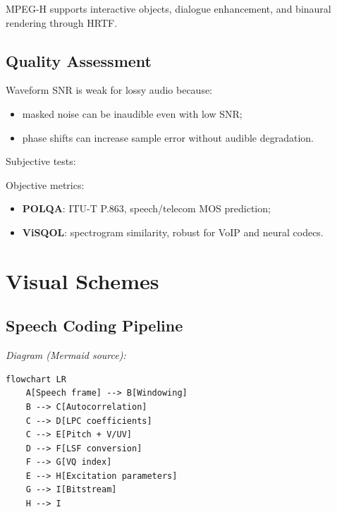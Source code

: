 MPEG-H supports interactive objects, dialogue enhancement, and binaural rendering through HRTF.

\subsection{Quality Assessment}

Waveform SNR is weak for lossy audio because:

\begin{itemize}
  \item masked noise can be inaudible even with low SNR;
  \item phase shifts can increase sample error without audible degradation.
\end{itemize}

Subjective tests:

\begin{center}
\end{center}

Objective metrics:

\begin{itemize}
  \item \textbf{POLQA}: ITU-T P.863, speech/telecom MOS prediction;
  \item \textbf{ViSQOL}: spectrogram similarity, robust for VoIP and neural codecs.
\end{itemize}

\section{Visual Schemes}

\subsection{Speech Coding Pipeline}

\begin{center}\footnotesize\itshape Diagram (Mermaid source):\end{center}
\begin{verbatim}
flowchart LR
    A[Speech frame] --> B[Windowing]
    B --> C[Autocorrelation]
    C --> D[LPC coefficients]
    C --> E[Pitch + V/UV]
    D --> F[LSF conversion]
    F --> G[VQ index]
    E --> H[Excitation parameters]
    G --> I[Bitstream]
    H --> I
\end{verbatim}

